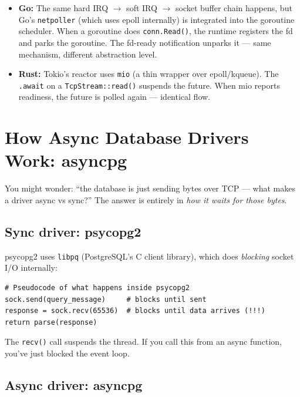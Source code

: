\documentclass[11pt,a4paper,oneside]{book}
\begin{document}
\begin{analogybox}
\begin{itemize}
    \item \textcolor{goblue}{\textbf{Go:}} The same hard IRQ $\to$ soft IRQ $\to$ socket buffer
          chain happens, but Go's \texttt{netpoller} (which uses epoll internally) is integrated
          into the goroutine scheduler. When a goroutine does \texttt{conn.Read()}, the runtime
          registers the fd and parks the goroutine. The fd-ready notification unparks it ---
          same mechanism, different abstraction level.
    \item \textcolor{BrickRed}{\textbf{Rust:}} Tokio's reactor uses \texttt{mio} (a thin wrapper
          over epoll/kqueue). The \texttt{.await} on a \texttt{TcpStream::read()} suspends the
          future. When mio reports readiness, the future is polled again --- identical flow.
\end{itemize}
\end{analogybox}

\section{How Async Database Drivers Work: asyncpg}

You might wonder: ``the database is just sending bytes over TCP --- what makes a driver async
vs sync?'' The answer is entirely in \emph{how it waits for those bytes}.

\subsection{Sync driver: psycopg2}

psycopg2 uses \texttt{libpq} (PostgreSQL's C client library), which does \emph{blocking}
socket I/O internally:

\begin{lstlisting}[style=python,numbers=none]
# Pseudocode of what happens inside psycopg2
sock.send(query_message)     # blocks until sent
response = sock.recv(65536)  # blocks until data arrives (!!!)
return parse(response)
\end{lstlisting}

The \texttt{recv()} call suspends the thread. If you call this from an async function, you've
just blocked the event loop.

\subsection{Async driver: asyncpg}
\end{document}
